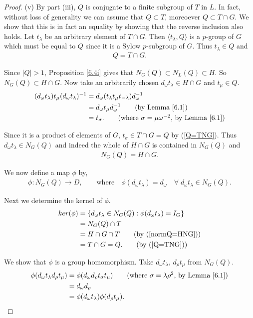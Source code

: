 \documentclass[a4paper , 11pt]{book}
\theoremstyle{definition}
\theoremstyle{remark}
\begin{document}
\begin{proof}
(v) By part (iii), $Q$ is conjugate to a finite subgroup of $T$ in $L$. In fact, without loss of generality we can assume that $Q \subset T$, moreoever $Q \subset T \cap G$. We show that this is in fact an equality by showing that the reverse inclusion also holds. Let $t_\lambda$ be an arbitrary element of $T \cap G$. Then $\langle t_\lambda, Q \rangle$ is a $p$-group of $G$ which must be equal to $Q$ since it is a Sylow $p$-subgroup of $G$. Thus $t_\lambda \in Q$ and
\begin{align}\label{Q=TNG} Q = T \cap G.
\end{align}

Since $|Q| > 1$, Proposition \ref{6.4i} gives that $N_G(Q) \subset N_L(Q) \subset H$. So $N_G(Q) \subset H \cap G$. Now take an arbitrarily chosen $d_\omega t_\lambda \in H \cap G$ and $t_\mu \in Q$.
\begin{align*} (d_\omega t_\lambda) t_\mu (d_\omega t_\lambda)^{-1} &= d_\omega ( t_\lambda t_\mu  t_{-\lambda}) d^{-1}_\omega
\\ &=  d_\omega t_\mu d^{-1}_\omega \tag{by Lemma \ref{6.1}}
\\ &= t_\sigma. \tag{where $\sigma = \mu \omega^{-2}$, by Lemma \ref{6.1}}
\end{align*}

Since it is a product of elements of $G$, $t_\sigma \in T \cap G = Q$ by (\ref{Q=TNG}). Thus $d_\omega t_\lambda \in N_G(Q)$ and indeed the whole of $H \cap G$ is contained in $N_G(Q)$ and
\begin{align}\label{normQ=HNG} N_G(Q) = H \cap G.
\end{align}

We now define a map $\phi$ by,
\begin{align*} \phi : N_G(Q) \longrightarrow D, \qquad \text{where} \quad \! \phi(d_\omega t_\lambda) = d_\omega \quad \forall \; d_\omega t_\lambda \in N_G(Q).
\end{align*}

Next we determine the kernel of $\phi$.
\begin{align*} ker(\phi) &= \{ d_\omega t_\lambda \in N_G(Q) : \phi(d_\omega t_\lambda) = I_G \}
\\ &= N_G(Q) \cap T
\\ &= H \cap G \cap T \tag{by (\ref{normQ=HNG})}
\\ &= T \cap G = Q. \tag{by (\ref{Q=TNG})}
\end{align*}

We show that $\phi$ is a group homomorphism. Take $d_\omega t_\lambda$, $d_\rho t_\mu$ from $ N_G(Q)$.
\begin{align*} \phi(d_\omega t_\lambda d_\rho t_\mu) &= \phi(d_\omega d_\rho t_\sigma t_\mu) \tag{where $\sigma = \lambda \rho^2$, by Lemma \ref{6.1}}
\\ &= d_\omega d_\rho
\\ &= \phi(d_\omega t_\lambda) \phi(d_\rho t_\mu).
\end{align*}


\end{proof}
\end{document}
